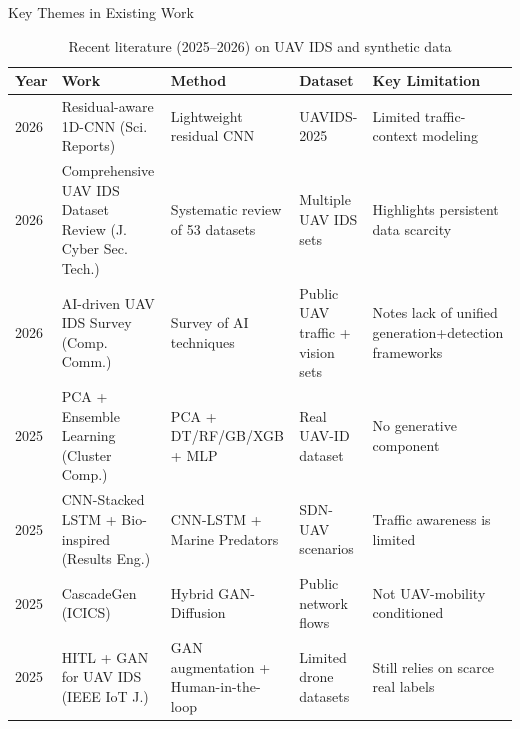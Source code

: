 \documentclass[10pt]{beamer}
\begin{document}
\begin{frame}[shrink=8]{Key Themes in Existing Work}
    \begin{table}
        \centering
        \footnotesize
        \caption{Recent literature (2025–2026) on UAV IDS and synthetic data}
        \begin{tabular}{@{}p{1.1cm}p{2.6cm}p{2.4cm}p{2.3cm}p{2.4cm}@{}}
            \toprule
            \textbf{Year} & \textbf{Work} & \textbf{Method} & \textbf{Dataset} & \textbf{Key Limitation} \\
            \midrule
            2026 & Residual-aware 1D-CNN (Sci. Reports) & Lightweight residual CNN & UAVIDS-2025 & Limited traffic-context modeling \\
            2026 & Comprehensive UAV IDS Dataset Review (J. Cyber Sec. Tech.) & Systematic review of 53 datasets & Multiple UAV IDS sets & Highlights persistent data scarcity \\
            2026 & AI-driven UAV IDS Survey (Comp. Comm.) & Survey of AI techniques & Public UAV traffic + vision sets & Notes lack of unified generation+detection frameworks \\
            2025 & PCA + Ensemble Learning (Cluster Comp.) & PCA + DT/RF/GB/XGB + MLP & Real UAV-ID dataset & No generative component \\
            2025 & CNN-Stacked LSTM + Bio-inspired (Results Eng.) & CNN-LSTM + Marine Predators & SDN-UAV scenarios & Traffic awareness is limited \\
            2025 & CascadeGen (ICICS) & Hybrid GAN-Diffusion & Public network flows & Not UAV-mobility conditioned \\
            2025 & HITL + GAN for UAV IDS (IEEE IoT J.) & GAN augmentation + Human-in-the-loop & Limited drone datasets & Still relies on scarce real labels \\
            \bottomrule
        \end{tabular}
    \end{table}
\end{frame}
\end{document}
